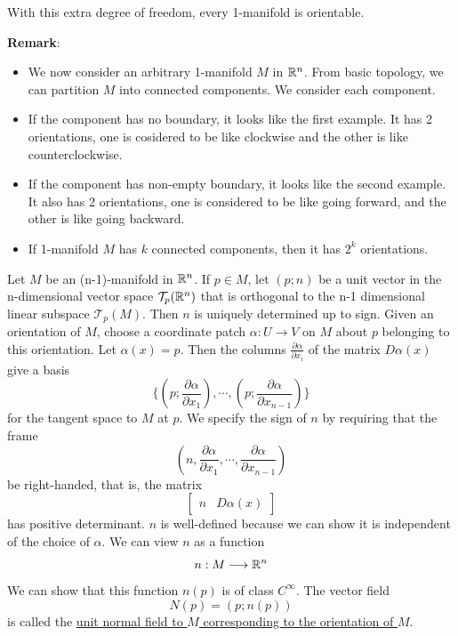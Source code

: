 \begin{theorem*}
    With this extra degree of freedom, every 1-manifold is orientable.
\end{theorem*}

\noindent\textbf{Remark}:
\begin{itemize}
    \item We now consider an arbitrary 1-manifold $M$ in $\mathbb{R}^n$. From basic topology, we can partition $M$ into connected components. We consider each component.
    \item If the component has no boundary, it looks like the first example. It has 2 orientations, one is cosidered to be like clockwise and the other is like counterclockwise.
    \item If the component has non-empty boundary, it looks like the second example. It also has 2 orientations, one is considered to be like going forward, and the other is like going backward.
    \item If 1-manifold $M$ has $k$ connected components, then it has $2^k$ orientations.
\end{itemize}

\begin{definition}
    Let $M$ be an (n-1)-manifold in $\mathbb{R}^n$. If $p\in M$, let $(p;n)$ be a unit vector in the n-dimensional vector space $\mathcal{T}_p(\mathbb{R}^n)$ that is orthogonal to the n-1 dimensional linear subspace $\mathcal{T}_p(M)$. 
    Then $n$ is uniquely determined up to sign. Given an orientation of $M$, choose a coordinate patch $\alpha:U\longrightarrow V$ on $M$ about $p$ belonging to this orientation. Let $\alpha(x)=p$. Then the columns $\frac{\partial \alpha}{\partial x_i}$ of the matrix $D\alpha(x)$ give a basis 
    $$\{(p;\frac{\partial \alpha}{\partial x_1}),\cdots,(p;\frac{\partial \alpha}{\partial x_{n-1}})\}$$
    for the tangent space to $M$ at $p$. We specify the sign of $n$ by requiring that the frame $$(n,\frac{\partial \alpha}{\partial x_1},\cdots,\frac{\partial \alpha}{\partial x_{n-1}})$$ be right-handed, that is, the matrix \begin{equation*}
        \begin{bmatrix}
            n & D\alpha(x)
        \end{bmatrix}
    \end{equation*}
    has positive determinant. $n$ is well-defined because we can show it is independent of the choice of $\alpha$. We can view $n$ as a function
    $$n:M\longrightarrow \mathbb{R}^n$$
    We can show that this function $n(p)$ is of class $C^{\infty}$. The vector field $$N(p)=(p;n(p))$$
    is called the \underline{unit normal field to $M$ corresponding to the orientation of $M$}.
\end{definition}

